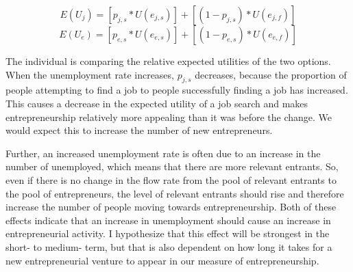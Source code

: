 \documentclass[]{ecca}
\begin{document}
\begin{equation}
E(U_j) = [p_{j,s} * U(e_{j,s})] + [(1-p_{j,s}) * U(e_{j,f})]
\end{equation} 
\begin{equation}
E(U_e) = [p_{e,s} * U(e_{e,s})] + [(1-p_{e,s}) * U(e_{e,f})]
\end{equation}

\noindent
 The individual is comparing the relative expected utilities of the two options. When the unemployment rate increases, $p_{j, s}$ decreases, because the proportion of people attempting to find a job to people successfully finding a job has increased. This causes a decrease in the expected utility of a job search and makes entrepreneurship relatively more appealing than it was before the change. We would expect this to increase the number of new entrepreneurs. 
 
 Further, an increased unemployment rate is often due to an increase in the number of unemployed, which means that there are more relevant entrants. So, even if there is no change in the flow rate from the pool of relevant entrants to the pool of entrepreneurs, the level of relevant entrants should rise and therefore increase the number of people moving towards entrepreneurship. Both of these effects indicate that an increase in unemployment should cause an increase in entrepreneurial activity. I hypothesize that this effect will be strongest in the short- to medium- term, but that is also dependent on how long it takes for a new entrepreneurial venture to appear in our measure of entrepreneurship.
\end{document}
